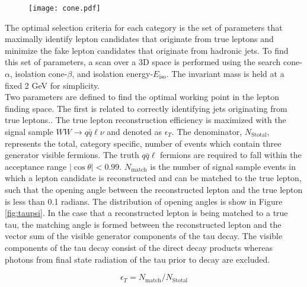 \begin{figure}

\texttt{[image: cone.pdf]}

\end{figure}
 The optimal selection criteria for each category is the set of parameters that maximally identify lepton candidates that originate from true leptons and minimize the fake lepton candidates that originate from hadronic jets. To find this set of parameters, a scan over a 3D space is performed using the search cone-$\alpha$, isolation cone-$\beta$, and isolation energy-$E_{\text{iso}}$. The invariant mass is held at a fixed 2 GeV for simplicity.\\
Two parameters are defined to find the optimal working point in the lepton finding space. The first is related to correctly identifying jets originating from true leptons..
The true lepton reconstruction efficiency is maximized with the signal sample $WW\rightarrow q\bar{q}\ell\nu$ and denoted as  $\epsilon_T$. The denominator, $N_{\text{Stotal}}$, represents the total, category specific, number of events which contain three generator visible fermions. The truth $q\bar{q}\ell$ fermions are required to fall within the acceptance range $|\cos\theta| < 0.99$. $N_{\text{match}}$ is the number of signal sample events in which a lepton candidate is reconstructed and can be matched to the true lepton, such that the opening angle between the reconstructed lepton and the true lepton is less than 0.1 radians. The distribution of opening angles is show in Figure \ref{fig:taupsi}. In the case that a reconstructed lepton is being matched to a true tau, the matching angle is formed between the reconstructed lepton and the vector sum of the visible generator components of the tau decay. The visible components of the tau decay consist of the direct decay products whereas photons from final state radiation of the tau prior to decay are excluded.

\begin{equation}
\label{eq:et}
\epsilon_T = N_{\text{match}}/N_{\text{Stotal}}
\end{equation}


